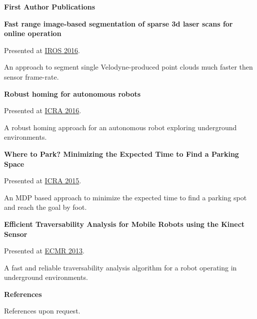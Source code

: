\documentclass[a4paper,12pt,final]{memoir}
\newcommand{\SmallSep}{\vspace{0.5em}}
\newcommand{\CVSection}[1]
	{\Large\textbf{#1}\par
	\SmallSep\normalsize\normalfont}
\newcommand{\CVItem}[1]
	{\textbf{\color{MidnightBlue} #1}}
\begin{document}
\CVSection{First Author Publications}
\CVItem{Fast range image-based segmentation of sparse 3d laser scans for online operation}
\begin{compactitem}[\color{MidnightBlue}$\circ$]
	\item Presented at \href{http://iros2016.org/}{IROS 2016}.
	\item An approach to segment single Velodyne-produced point clouds much faster then sensor frame-rate.
\end{compactitem}
\CVItem{Robust homing for autonomous robots}
\begin{compactitem}[\color{MidnightBlue}$\circ$]
	\item Presented at \href{http://icra2016.org/}{ICRA 2016}.
	\item A robust homing approach for an autonomous robot exploring underground environments.
\end{compactitem}
\CVItem{Where to Park? Minimizing the Expected Time to Find a Parking Space}
\begin{compactitem}[\color{MidnightBlue}$\circ$]
	\item Presented at \href{http://icra2015.org/}{ICRA 2015}.
	\item An MDP based approach to minimize the expected time to find a parking spot and reach the goal by foot.
\end{compactitem}
\CVItem{Efficient Traversability Analysis for Mobile Robots using the Kinect Sensor}
\begin{compactitem}[\color{MidnightBlue}$\circ$]
	\item Presented at \href{http://www.iri.upc.edu/ecmr13/#home}{ECMR 2013}.
	\item A fast and reliable traversability analysis algorithm for a robot
	operating in underground environments.
\end{compactitem}
\SmallSep

\vfill
\CVSection{References}
	References upon request.
\clearpage
\framebreak

\end{document}
